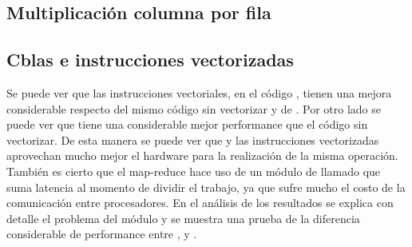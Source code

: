 \subsection{Multiplicación columna por fila}

    \def\model{ColumnByRow}
    \def\analisisAmdahl{
    Se puede observar que el speed up teórico tiende al máximo speed-up,
    mientras que el real nos muestra que no usa toda la paralelizacion, ya que al
    pasar de 1 a 2 threads el tiempo no cae a la mitad, y al pasar de 1 a 4 threads
    no cae a la cuarta parte. Se puede ver que tiene un speed-up de casi 2 lo
    cual quiere decir que hace uso de la mitad de la paralelización.
    }
    \def\analisisGustafson{
    Se puede ver que estos resultados demuestran que la sección serie del
    problema se mantiene casi constante respecto de la sección paralela,
    que varía en forma ascendente con el tamaño de los datos de entrada.
    Pero además se puede observar que hay mucha ineficiencia respecto del uso de
    la paralelización, ya que al aumentar el trabajo en casi el doble y usar
    dos procesadores debería tardar aproximadamente lo mismo. Sin embargo, vemos
    que el tiempo paralelo se duplicó, lo cual muestra que hay un problema de
    comunicación al aumentar el paralelismo. Más adelante se explicará que el
    módulo Pool es ineficiente respecto del uso de recursos.
    }
    
    \newpage
    \clearpage

\subsection{Cblas e instrucciones vectorizadas}
    \def\text{Tiempo serie de multiplicación en segundos}
    \def\path{dgemm.png}
    \def\scale{.6}
    

    Se puede ver que las instrucciones vectoriales, en el código
    , tienen una mejora considerable respecto del mismo
    código sin vectorizar y de . Por otro lado se puede ver que
     tiene una considerable mejor performance que el código
     sin vectorizar.
    De esta manera se puede ver que  y las instrucciones vectorizadas
    aprovechan mucho mejor el hardware para la realización de la misma operación.
    También es cierto que el map-reduce hace uso de un módulo de 
    llamado  que suma latencia al momento de dividir el trabajo, ya
    que sufre mucho el costo de la comunicación entre procesadores. En el análisis
    de los resultados se explica con detalle el problema del módulo 
    y se muestra una prueba de la diferencia considerable de performance entre
    ,  y .
